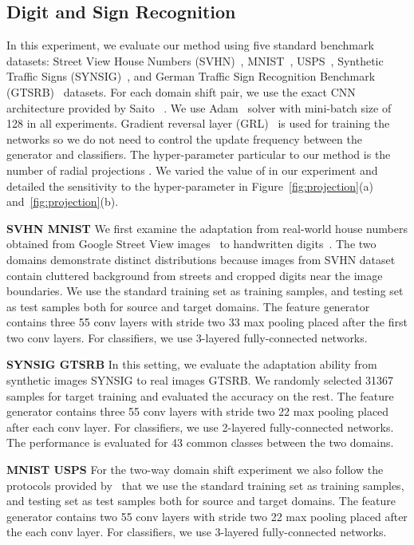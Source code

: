 \documentclass[10pt,twocolumn,letterpaper]{article}
\begin{document}
\subsection{Digit and Sign Recognition}
In this experiment, we evaluate our method using five standard benchmark datasets: Street View House Numbers (SVHN)~\cite{netzer2011reading}, MNIST~\cite{lecun1998gradient}, USPS~\cite{hull1994database}, Synthetic Traffic Signs (SYNSIG)~\cite{moiseev2013evaluation}, and German Traffic Sign Recognition Benchmark (GTSRB)~\cite{stallkamp2011german} datasets.
For each domain shift pair, we use the exact CNN architecture provided by Saito \etal~\cite{saito2017maximum}. We use Adam~\cite{kingma2014adam} solver with mini-batch size of 128 in all experiments. Gradient reversal layer (GRL)~\cite{ganin2014unsupervised} is used for training the networks so we do not need to control the update frequency between the generator and classifiers. The hyper-parameter particular to our method is the number of radial projections . We varied the value of  in our experiment and detailed the sensitivity to the hyper-parameter in Figure~\ref{fig:projection}(a) and~\ref{fig:projection}(b).


\vspace{2mm}
\noindent \textbf{SVHN  MNIST}
We first examine the adaptation from real-world house numbers obtained from Google Street View images~\cite{netzer2011reading} to handwritten digits~\cite{lecun1998gradient}. The two domains demonstrate distinct distributions because images from SVHN dataset contain cluttered background from streets and cropped digits near the image boundaries.
We use the standard training set as training samples, and testing set as test samples both for source and target domains. The feature generator contains three 55 conv layers with stride two 33 max pooling placed after the first two conv layers. For classifiers, we use 3-layered fully-connected networks. 


\vspace{2mm}
\noindent \textbf{SYNSIG  GTSRB}
In this setting, we evaluate the adaptation ability from synthetic images SYNSIG to real images GTSRB. We randomly selected 31367 samples for target training and evaluated the accuracy on the rest. The feature generator contains three 55 conv layers with stride two 22 max pooling placed after each conv layer. For classifiers, we use 2-layered fully-connected networks. The performance is evaluated for 43 common classes between the two domains.

\vspace{2mm}
\noindent \textbf{MNIST  USPS}
For the two-way domain shift experiment we also follow the protocols provided by~\cite{saito2017maximum} that we use the standard training set as training samples, and testing set as test samples both for source and target domains. The feature generator contains two 55 conv layers with stride two 22 max pooling placed after the each conv layer. For classifiers, we use 3-layered fully-connected networks. 
\end{document}

